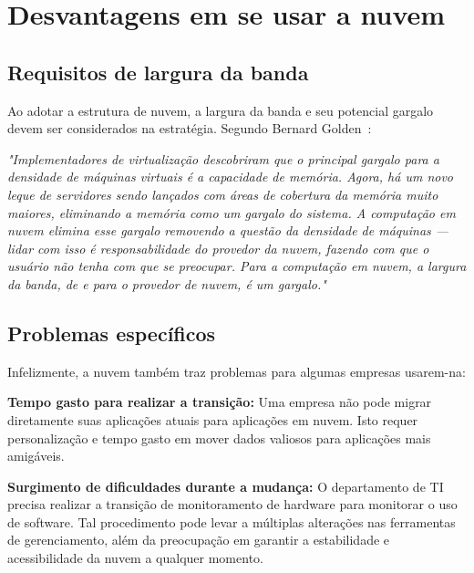 \section{Desvantagens em se usar a nuvem}

\subsection{Requisitos de largura da banda}

Ao adotar a estrutura de nuvem, a largura da banda e seu potencial gargalo devem ser 
considerados na estratégia. Segundo Bernard 
Golden~\cite{cio-cloud-computing-bottleneck}:

\begin{displayquote}
\emph{
    "Implementadores de virtualização descobriram que o principal gargalo para a 
    densidade de máquinas virtuais é a capacidade de memória. Agora, há um novo
    leque de servidores sendo lançados com áreas de cobertura da memória muito
    maiores, eliminando a memória como um gargalo do sistema. A computação em nuvem
    elimina esse gargalo removendo a questão da densidade de máquinas --- lidar com
    isso é responsabilidade do provedor da nuvem, fazendo com que o usuário não tenha
    com que se preocupar.
    Para a computação em nuvem, a largura da banda, de e para o provedor de nuvem,
    é um gargalo."
}
\end{displayquote}

\subsection{Problemas específicos}

Infelizmente, a nuvem também traz problemas para algumas empresas usarem-na:

\newcommand{\itemm}[1]{\item\textbf{#1}}

\begin{itemise}

    \itemm{Tempo gasto para realizar a transição:} Uma empresa não pode migrar
    diretamente suas aplicações atuais para aplicações em nuvem. Isto requer
    personalização e tempo gasto em mover dados valiosos para aplicações mais
    amigáveis.

    \itemm{Surgimento de dificuldades durante a mudança:} O departamento de TI 
    precisa realizar a transição de monitoramento de hardware para monitorar o uso 
    de software. Tal procedimento pode levar a múltiplas alterações nas ferramentas 
    de gerenciamento, além da preocupação em garantir a estabilidade e 
    acessibilidade da nuvem a qualquer momento.

\end{itemise}

\undef\itemm
